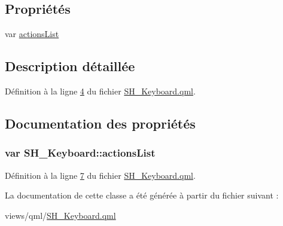 \subsection*{Propriétés}
\begin{DoxyCompactItemize}
\item 
var \hyperlink{classSH__Keyboard_a0fafeb62ceee0f38c8d7d9d5919795e5}{actions\-List}
\end{DoxyCompactItemize}


\subsection{Description détaillée}


Définition à la ligne \hyperlink{SH__Keyboard_8qml_source_l00004}{4} du fichier \hyperlink{SH__Keyboard_8qml_source}{S\-H\-\_\-\-Keyboard.\-qml}.



\subsection{Documentation des propriétés}
\hypertarget{classSH__Keyboard_a0fafeb62ceee0f38c8d7d9d5919795e5}{
\subsubsection[{actions\-List}]{\setlength{\rightskip}{0pt plus 5cm}var S\-H\-\_\-\-Keyboard\-::actions\-List}}\label{classSH__Keyboard_a0fafeb62ceee0f38c8d7d9d5919795e5}


Définition à la ligne \hyperlink{SH__Keyboard_8qml_source_l00007}{7} du fichier \hyperlink{SH__Keyboard_8qml_source}{S\-H\-\_\-\-Keyboard.\-qml}.



La documentation de cette classe a été générée à partir du fichier suivant \-:\begin{DoxyCompactItemize}
\item 
views/qml/\hyperlink{SH__Keyboard_8qml}{S\-H\-\_\-\-Keyboard.\-qml}\end{DoxyCompactItemize}
